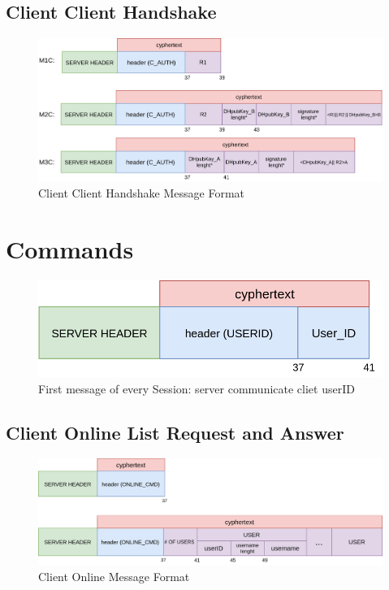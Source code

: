 \documentclass[11pt]{report}
\begin{document}
\subsection*{Client Client Handshake}
\begin{figure}[H]
	\centering
	\includegraphics[scale=0.28]{img/AuthClientClient_messageFormat.png}
	\caption{Client Client Handshake Message Format}
	\label {img: FormatClientClient}
\end{figure}

\section{Commands}
\begin{figure}[H]
	\centering
	\includegraphics[scale=0.28]{img/SessionFirstMessageFormat.png}
	\caption{First message of every Session: server communicate cliet userID}
	\label {img: FormatClientServerFirst}
\end{figure}
\subsection*{Client Online List Request and Answer }
\begin{figure}[H]
	\centering
	\includegraphics[scale=0.25]{img/ClientOnline_messageFormat.png}
	\caption{Client Online Message Format}
	\label {img: FormatClientOnline}
\end{figure}
\end{document}
